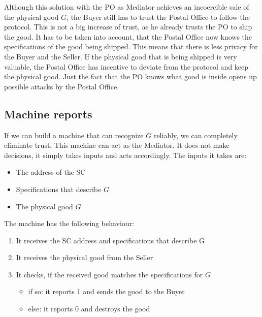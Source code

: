 \documentclass{cacthesis}
\begin{document}
Although this solution with the PO as Mediator achieves an incoercible sale of the physical good $G$, the Buyer still has to trust the Postal Office to follow the protocol. This is not a big increase of trust, as he already trusts the PO to ship the good. 
It has to be taken into account, that the Postal Office now knows the specifications of the good being shipped. This means that there is less privacy for the Buyer and the Seller. If the physical good that is being shipped is very valuable, the Postal Office has incentive to deviate from the protocol and keep the physical good. Just the fact that the PO knows what good is inside opens up possible attacks by the Postal Office.\newline


\subsection{Machine reports}
\label{sec:machine-reporst}
If we can build a machine that can recognize $G$ reliably, we can completely eliminate trust. This machine can act as the Mediator. It does not make decisions, it simply takes inputs and acts accordingly.\newline
The inputs it takes are:
\begin{itemize}
    \item The address of the SC
    \item Specifications that describe $G$
    \item The physical good $G$\newline
\end{itemize}


The machine has the following behaviour:
\begin{enumerate}
    \item It receives the SC address and specifications that describe G
    \item It receives the physical good from the Seller
    \item It checks, if the received good matches the specifications for $G$
        \begin{itemize}
            \item if so: it reports 1 and sends the good to the Buyer
            \item else: it reports 0 and destroys the good
        \end{itemize}
\end{enumerate}
\end{document}
